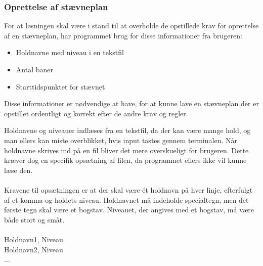\subsubsection{Oprettelse af stævneplan}
For at løsningen skal være i stand til at overholde de opstillede krav for oprettelse af en stævneplan, har programmet brug for disse informationer fra brugeren:
\begin{itemize}
    \item Holdnavne med niveau i en tekstfil
    \item Antal baner
    \item Starttidspunktet for stævnet
\end{itemize}
Disse informationer er nødvendige at have, for at kunne lave en stævneplan der er opstillet ordentligt og korrekt efter de andre krav og regler. 
\par
Holdnavne og niveauer indlæses fra en tekstfil, da der kan være mange hold, og man ellers kan miste overblikket, hvis input tastes gennem terminalen. Når holdnavne skrives ind på en fil bliver det mere overskueligt for brugeren. Dette kræver dog en specifik opsætning af filen, da programmet ellers ikke vil kunne læse den.
\\\\
Kravene til opsætningen er at der skal være ét holdnavn på hver linje, efterfulgt af et komma og holdets niveau. Holdnavnet må indeholde specialtegn, men det første tegn skal være et bogstav.
Niveauet, der angives med et bogstav, må være både stort og småt.
\\\\
Holdnavn1, Niveau\\
Holdnavn2, Niveau\\
...\\

